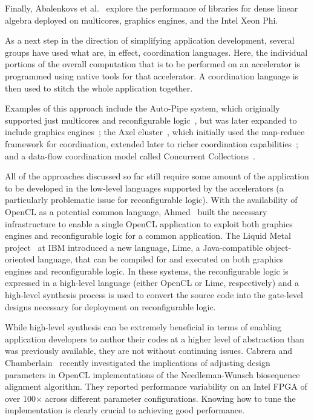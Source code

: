 Finally, Abalenkovs et al.~\cite{aad+15} explore the performance of
libraries for dense linear algebra deployed on multicores, graphics engines,
and the Intel Xeon Phi.

As a next step in the direction of simplifying application development,
several groups have used what are, in effect, coordination languages.
Here, the individual portions of the overall computation that is to be
performed on an accelerator is programmed using native tools for that
accelerator.  A coordination language is then used to stitch the whole
application together.

Examples of this approach include the Auto-Pipe system, which originally
supported just multicores and reconfigurable logic~\cite{ftb+06}, but was
later expanded to include graphics engines~\cite{cft+10};
the Axel cluster~\cite{tl10}, which initially used the map-reduce
framework for coordination,
extended later to richer coordination capabilities~\cite{ttpl10};
and a data-flow coordination model called Concurrent Collections~\cite{szb+12}.

All of the approaches discussed so far still require some amount of
the application to be developed in the low-level languages supported
by the accelerators (a particularly problematic issue for reconfigurable
logic).
With the availability of OpenCL as a potential common language,
Ahmed~\cite{Ahmed11} built the necessary infrastructure to enable
a single OpenCL application to exploit both graphics engines and
reconfigurable logic for a common application.
The Liquid Metal project~\cite{abb+12} at IBM introduced a new language,
Lime, a Java-compatible object-oriented language, that can be compiled
for and executed on both graphics engines and reconfigurable logic.
In these systems, the reconfigurable logic is expressed in a high-level
language (either OpenCL or Lime, respectively) and a high-level
synthesis process is used to convert the source code into the gate-level
designs necessary for deployment on reconfigurable logic.


While high-level synthesis can be extremely beneficial in terms of
enabling application developers to author their codes at a higher level
of abstraction than was previously available, they are not without 
continuing issues.  Cabrera and Chamberlain~\cite{cc19} recently
investigated the implications of adjusting design parameters in OpenCL 
implementations of the Needleman-Wunsch biosequence alignment algorithm.
They reported performance variability on an Intel FPGA of over 100$\times$
across different parameter configurations.
Knowing how to tune the implementation is clearly crucial to achieving
good performance.

